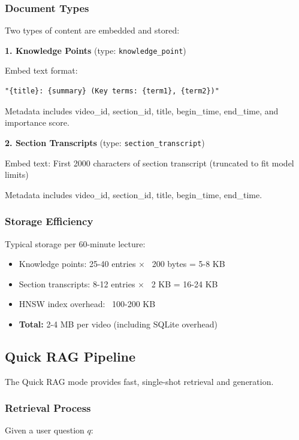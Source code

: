\documentclass[12pt,a4paper]{article}
\begin{document}
\subsubsection{Document Types}

Two types of content are embedded and stored:

\textbf{1. Knowledge Points} (type: \texttt{knowledge\_point})

Embed text format:
\begin{verbatim}
"{title}: {summary} (Key terms: {term1}, {term2})"
\end{verbatim}

Metadata includes video\_id, section\_id, title, begin\_time, end\_time, and importance score.

\textbf{2. Section Transcripts} (type: \texttt{section\_transcript})

Embed text: First 2000 characters of section transcript (truncated to fit model limits)

Metadata includes video\_id, section\_id, title, begin\_time, end\_time.

\subsubsection{Storage Efficiency}

Typical storage per 60-minute lecture:

\begin{itemize}
    \item Knowledge points: 25-40 entries $\times$ ~200 bytes = 5-8 KB
    \item Section transcripts: 8-12 entries $\times$ ~2 KB = 16-24 KB
    \item HNSW index overhead: ~100-200 KB
    \item \textbf{Total:} 2-4 MB per video (including SQLite overhead)
\end{itemize}

\subsection{Quick RAG Pipeline}

The Quick RAG mode provides fast, single-shot retrieval and generation.

\subsubsection{Retrieval Process}

Given a user question $q$:
\end{document}
